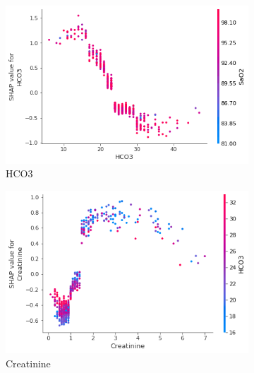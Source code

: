\documentclass[12pt]{article}
\begin{document}
\begin{figure}[H]
     \centering
     \begin{subfigure}[b]{0.47\textwidth}
         \centering
         \includegraphics[width=\linewidth]{TreeExplainer Final1 Global/TreeExplainer Final1 Global for HCO3.png}
         \caption{HCO3}
     \end{subfigure}
     \hfill
     \begin{subfigure}[b]{0.47\textwidth}
         \centering
         \includegraphics[width=\linewidth]{TreeExplainer Final1 Global/TreeExplainer Final1 Global for Creatinine.png}
         \caption{Creatinine}
     \end{subfigure}
     \hfill
     \begin{subfigure}[b]{0.47\textwidth}
         \centering

\end{subfigure}
\end{figure}
\end{document}
